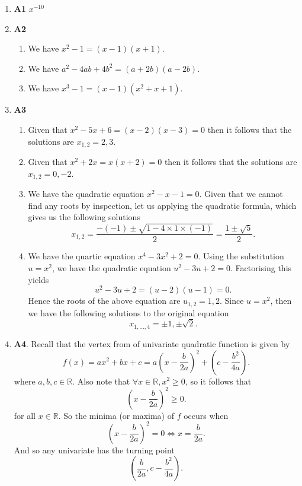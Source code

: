 \documentclass[12pt,oneside]{book}
\begin{document}
    \begin{enumerate}
	\item \textbf{A1} $x^{-10}$    
        \item \textbf{A2} \begin{enumerate}
            \item We have $x ^2 - 1 = (x - 1)(x + 1)$.
            \item We have $a^2 - 4ab + 4b^2 = (a + 2b)(a - 2b)$.
            \item We have $x ^3 - 1 = (x - 1)(x^2 + x + 1)$.
        \end{enumerate}
        \item \textbf{A3} \begin{enumerate}
            \item Given that $x^2 - 5x + 6 = (x-2)(x-3) = 0$ then it follows that the solutions are $x_{1,2} = 2, 3$.
            \item Given that $x^2 + 2x = x (x+2) = 0$ then it follows that the solutions are $x_{1,2} = 0, -2$.
            \item We have the quadratic equation $x^2 - x - 1 = 0$. Given that we cannot find any roots by inspection, let us applying the quadratic formula, which gives us the following solutions \[
                x_{1,2} = \frac{-(-1) \pm \sqrt{1 - 4 \times 1 \times (-1) } }{2} = \frac{1 \pm \sqrt{5}}{2}
            .\]  
            \item We have the quartic equation $x^4 - 3x^2 + 2 = 0$. Using the substitution $u = x^2$, we have the quadratic equation $u^2 - 3u + 2 = 0$. Factorising this yields \[
                u^2 - 3u + 2 = (u - 2) (u - 1) = 0
            .\]
            Hence the roots of the above equation are $u_{1,2} = 1, 2$. Since $u = x^2$, then we have the following solutions to the original equation \[
                x_{1,\ldots,4} = \pm 1, \pm \sqrt{2}
            .\]     
        \end{enumerate}
        \item \textbf{A4}. Recall that the vertex from of univariate quadratic function is given by \[
            f(x) = ax^2 + bx + c = a \left( x - \frac{b}{2a} \right)^2 + \left( c - \frac{b^2}{4a} \right)
        .\] where $a, b, c \in \mathbb{R}$. Also note that $\forall x \in \mathbb{R}, x^2 \geq 0$, so it follows that \[
            \left( x - \frac{b}{2a} \right)^2 \geq 0
        .\] for all $x \in \mathbb{R}$. So the minima (or maxima) of $f$ occurs when \[
            \left( x - \frac{b}{2a} \right)^2 = 0 \iff x = \frac{b}{2a}
        .\] And so any univariate has the turning point \[
            \left( \frac{b}{2a},  c - \frac{b^2}{4a}\right)
        .\] 
        

\end{enumerate}
\end{document}
